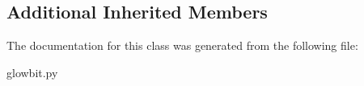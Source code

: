 \subsection*{Additional Inherited Members}


The documentation for this class was generated from the following file\+:\begin{DoxyCompactItemize}
\item 
glowbit.\+py\end{DoxyCompactItemize}
